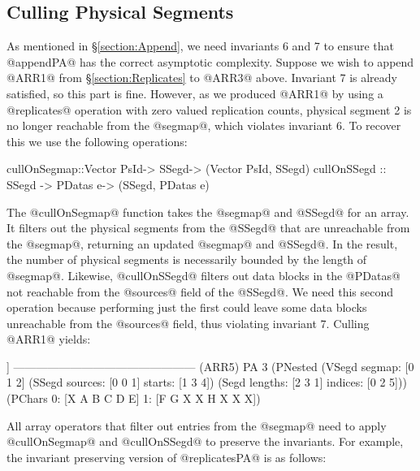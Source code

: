 \subsection{Culling Physical Segments}
\label{section:Culling}
As mentioned in \S\ref{section:Append}, we need invariants 6 and 7 to ensure that @appendPA@ has the correct asymptotic complexity. Suppose we wish to append @ARR1@ from \S\ref{section:Replicates} to @ARR3@ above. Invariant 7 is already satisfied, so this part is fine. However, as we produced @ARR1@ by using a @replicates@ operation with zero valued replication counts, physical segment 2 is no longer reachable from the @segmap@, which violates invariant 6. To recover this we use the following operations:
\par
\begin{small}
\begin{code}
cullOnSegmap::Vector PsId-> SSegd-> (Vector PsId, SSegd)
cullOnSSegd ::   SSegd   -> PDatas e-> (SSegd, PDatas e)
\end{code}
\end{small}
\par
The @cullOnSegmap@ function takes the @segmap@ and @SSegd@ for an array. It filters out the physical segments from the @SSegd@ that are unreachable from the @segmap@, returning an updated @segmap@ and @SSegd@. In the result, the number of physical segments is necessarily bounded by the length of @segmap@. Likewise, @cullOnSSegd@ filters out data blocks in the @PDatas@ not reachable from the @sources@ field of the @SSegd@. We need this second operation because performing just the first could leave some data blocks unreachable from the @sources@ field, thus violating invariant 7. Culling @ARR1@ yields:
\par
\begin{small}
\begin{code}
              [[A B] [C D E] [H]]
 ------------------------------------------------ (ARR5)
  PA 3 (PNested
   (VSegd  segmap: [0 1 2]
   (SSegd sources: [0 0 1]  starts: [1 3 4])
   (Segd  lengths: [2 3 1] indices: [0 2 5]))
   (PChars 0: [X A B C D E]
           1: [F G X X H X X X])
\end{code}
\end{small}
\par
All array operators that filter out entries from the @segmap@ need to apply @cullOnSegmap@ and @cullOnSSegd@ to preserve the invariants. For example, the invariant preserving version of @replicatesPA@ is as follows:
\par
